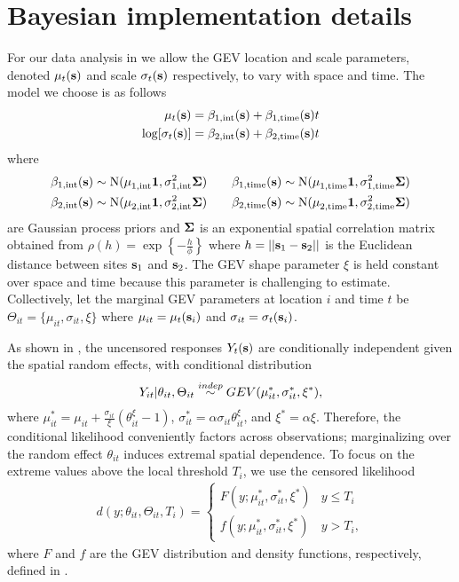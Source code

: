 \documentclass[11pt]{article}
\begin{document}
\section{Bayesian implementation details}\label{ebs:MCMC}
For our data analysis in  we allow the GEV location and scale parameters, denoted $\mu_t(\mbox{\bf s})$ and scale $\sigma_t(\mbox{\bf s})$ respectively, to vary with space and time.
The model we choose is as follows
\begin{align}\label{ebeq:GPprior}
  \mu_t(\mbox{\bf s}) &= \beta_{1, \text{int}}(\mbox{\bf s}) + \beta_{1, \text{time}}(\mbox{\bf s}) t\\
  \log[\sigma_t(\mbox{\bf s})] &= \beta_{2, \text{int}}(\mbox{\bf s}) + \beta_{2, \text{time}}(\mbox{\bf s}) t
\end{align}
where
\begin{align} \label{ebeq:GPhyper}
  \beta_{1, \text{int}}(\mbox{\bf s}) &\sim \text{N}(\mu^{\phantom{2}}_{1, \text{int}} \mbox{\boldmath $1$}, \sigma^2_{1, \text{int}} \mbox{\boldmath $\Sigma$}) \quad &\beta_{1, \text{time}}(\mbox{\bf s}) &\sim \text{N}(\mu^{\phantom{2}}_{1, \text{time}} \mbox{\boldmath $1$}, \sigma^2_{1, \text{time}} \mbox{\boldmath $\Sigma$}) \\
  \beta_{2, \text{int}}(\mbox{\bf s}) &\sim \text{N}(\mu^{\phantom{2}}_{2, \text{int}} \mbox{\boldmath $1$}, \sigma^2_{2, \text{int}} \mbox{\boldmath $\Sigma$}) \quad &\beta_{2, \text{time}}(\mbox{\bf s}) &\sim \text{N}(\mu^{\phantom{2}}_{2, \text{time}} \mbox{\boldmath $1$}, \sigma^2_{2, \text{time}} \mbox{\boldmath $\Sigma$}) \nonumber
\end{align}
are Gaussian process priors and $\mbox{\boldmath $\Sigma$}$ is an exponential spatial correlation matrix obtained from \mbox{$\rho(h) = \exp\left\{- \frac{h}{\phi}\right\}$} where $h = ||\mbox{\bf s}_1 - \mbox{\bf s}_2||$ is the Euclidean distance between sites $\mbox{\bf s}_1$ and $\mbox{\bf s}_2$.
The GEV shape parameter $\xi$ is held constant over space and time because this parameter is challenging to estimate.
Collectively, let the marginal GEV parameters at location $i$ and time $t$ be $\Theta_{it} = \{\mu_{it},\sigma_{it},\xi\}$ where $\mu_{it} = \mu_t(\mbox{\bf s}_i)$ and $\sigma_{it} = \sigma_t(\mbox{\bf s}_i)$.

As shown in \citet{Reich2012}, the uncensored responses $Y_{t}(\mbox{\bf s})$ are conditionally independent given the spatial random effects, with conditional distribution
\begin{align} \label{ebeq:Ycond}
   Y_{it}|\theta_{it},\Theta_{it}\stackrel{indep}{\sim} GEV(\mu^*_{it}, \sigma_{it}^*,\xi^*),
\end{align}
where $\mu_{it}^* = \mu_{it} + \frac{\sigma_{it}}{\xi}(\theta_{it}^\xi - 1)$,
$\sigma_{it}^* = \alpha\sigma_{it}\theta_{it}^\xi$, and $\xi^* = \alpha\xi$.
Therefore, the conditional likelihood conveniently factors across observations; marginalizing over the random effect $\theta_{it}$ induces extremal spatial dependence.
To focus on the extreme values above the local threshold $T_i$, we use the censored likelihood
\begin{align} \label{ebeq:g}
d(y;\theta_{it},\Theta_{it}, T_i)  =
\left\{\begin{array}{ll}
    F(y;\mu_{it}^*,\sigma_{it}^*,\xi^*) & y \le T_i \\
  f(y;\mu_{it}^*,\sigma_{it}^*,\xi^*) & y>T_i,
\end{array}\right.
\end{align}
where $F$ and $f$ are the GEV distribution and density functions, respectively, defined in .
\end{document}
